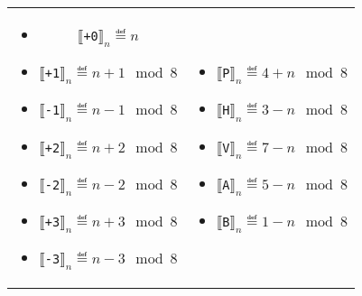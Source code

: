 \begin{tabular}{cc}
    \begin{minipage}[t]{0.45\textwidth}
        \begin{itemize}
        \item $\llbracket$\verb#+0#$\rrbracket_n  \eqdef  n$ 
        \item $\llbracket$\verb#+1#$\rrbracket_n  \eqdef  n+1 \mod 8$  
        \item $\llbracket$\verb#-1#$\rrbracket_n  \eqdef  n-1 \mod 8$  
        \item $\llbracket$\verb#+2#$\rrbracket_n  \eqdef  n+2 \mod 8$  
        \item $\llbracket$\verb#-2#$\rrbracket_n  \eqdef  n-2 \mod 8$  
        \item $\llbracket$\verb#+3#$\rrbracket_n  \eqdef  n+3 \mod 8$  
        \item $\llbracket$\verb#-3#$\rrbracket_n  \eqdef  n-3 \mod 8$  
        \end{itemize}
    \end{minipage}
    &
    \begin{minipage}[t]{0.45\textwidth}
        \begin{itemize}
        \item $\llbracket$\verb#P#$ \rrbracket_n  \eqdef  4+n \mod 8$  
        \item $\llbracket$\verb#H#$ \rrbracket_n  \eqdef  3-n \mod 8$  
        \item $\llbracket$\verb#V#$ \rrbracket_n  \eqdef  7-n \mod 8$  
        \item $\llbracket$\verb#A#$ \rrbracket_n  \eqdef  5-n \mod 8$  
        \item $\llbracket$\verb#B#$ \rrbracket_n  \eqdef  1-n \mod 8$  
        \end{itemize}
    \end{minipage}
\end{tabular}

\medskip

